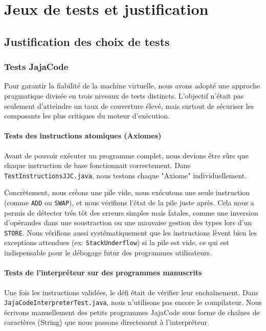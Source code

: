 \section{Jeux de tests et justification}

\subsection{Justification des choix de tests}

\subsubsection{Tests JajaCode}

Pour garantir la fiabilité de la machine virtuelle, nous avons adopté une approche pragmatique divisée en trois niveaux de tests distincts. L'objectif n'était pas seulement d'atteindre un taux de couverture élevé, mais surtout de sécuriser les composants les plus critiques du moteur d'exécution.

\paragraph{Tests des instructions atomiques (Axiomes)}
Avant de pouvoir exécuter un programme complet, nous devions être sûrs que chaque instruction de base fonctionnait correctement. Dans \texttt{TestInstructionsJJC.java}, nous testons chaque "Axiome" individuellement.

Concrètement, nous créons une pile vide, nous exécutons une seule instruction (comme \texttt{ADD} ou \texttt{SWAP}), et nous vérifions l'état de la pile juste après. Cela nous a permis de détecter très tôt des erreurs simples mais fatales, comme une inversion d'opérandes dans une soustraction ou une mauvaise gestion des types lors d'un \texttt{STORE}. Nous vérifions aussi systématiquement que les instructions lèvent bien les exceptions attendues (ex: \texttt{StackUnderflow}) si la pile est vide, ce qui est indispensable pour le débogage futur des programmes utilisateurs.

\paragraph{Tests de l'interpréteur sur des programmes manuscrits}
Une fois les instructions validées, le défi était de vérifier leur enchaînement. Dans \texttt{JajaCodeInterpreterTest.java}, nous n'utilisons pas encore le compilateur. Nous écrivons manuellement des petits programmes JajaCode sous forme de chaînes de caractères (String) que nous passons directement à l'interpréteur.

